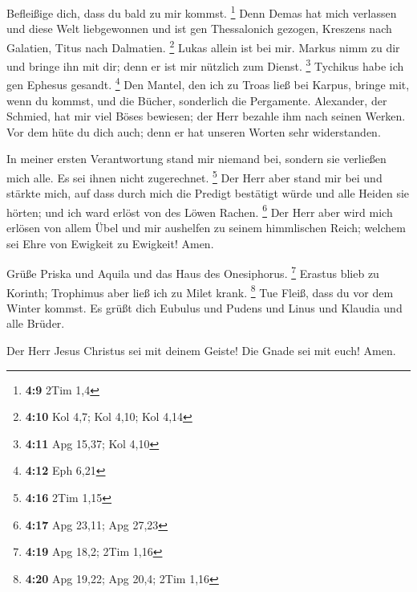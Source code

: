  Befleißige dich, dass du bald zu mir kommst. \footnote{\textbf{4:9}
  2Tim 1,4}  Denn Demas hat mich verlassen und diese Welt
liebgewonnen und ist gen Thessalonich gezogen, Kreszens nach Galatien,
Titus nach Dalmatien. \footnote{\textbf{4:10} Kol 4,7; Kol 4,10; Kol
  4,14}  Lukas allein ist bei mir. Markus nimm zu dir und
bringe ihn mit dir; denn er ist mir nützlich zum Dienst. \footnote{\textbf{4:11}
  Apg 15,37; Kol 4,10}  Tychikus habe ich gen Ephesus
gesandt. \footnote{\textbf{4:12} Eph 6,21}  Den Mantel, den
ich zu Troas ließ bei Karpus, bringe mit, wenn du kommst, und die
Bücher, sonderlich die Pergamente.  Alexander, der Schmied,
hat mir viel Böses bewiesen; der Herr bezahle ihm nach seinen Werken.
 Vor dem hüte du dich auch; denn er hat unseren Worten sehr
widerstanden.

 In meiner ersten Verantwortung stand mir niemand bei,
sondern sie verließen mich alle. Es sei ihnen nicht zugerechnet.
\footnote{\textbf{4:16} 2Tim 1,15}  Der Herr aber stand mir
bei und stärkte mich, auf dass durch mich die Predigt bestätigt würde
und alle Heiden sie hörten; und ich ward erlöst von des Löwen Rachen.
\footnote{\textbf{4:17} Apg 23,11; Apg 27,23}  Der Herr
aber wird mich erlösen von allem Übel und mir aushelfen zu seinem
himmlischen Reich; welchem sei Ehre von Ewigkeit zu Ewigkeit! Amen.

 Grüße Priska und Aquila und das Haus des Onesiphorus.
\footnote{\textbf{4:19} Apg 18,2; 2Tim 1,16}  Erastus blieb
zu Korinth; Trophimus aber ließ ich zu Milet krank. \footnote{\textbf{4:20}
  Apg 19,22; Apg 20,4; 2Tim 1,16}  Tue Fleiß, dass du vor
dem Winter kommst. Es grüßt dich Eubulus und Pudens und Linus und
Klaudia und alle Brüder.

 Der Herr Jesus Christus sei mit deinem Geiste! Die Gnade
sei mit euch! Amen.
